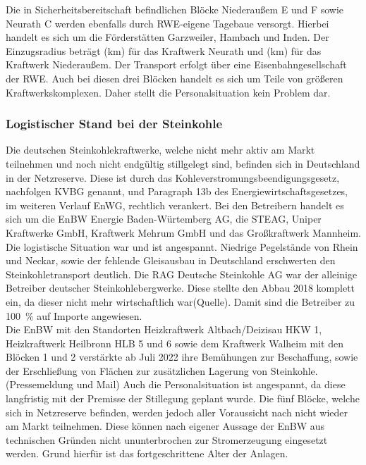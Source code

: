 		Die in Sicherheitsbereitschaft befindlichen Blöcke Niederaußem E und F sowie Neurath C werden ebenfalls durch RWE-eigene Tagebaue versorgt. Hierbei handelt es sich um die Förderstätten Garzweiler, Hambach und Inden. Der Einzugsradius beträgt (km) für das Kraftwerk Neurath und (km) für das Kraftwerk Niederaußem. Der Transport erfolgt über eine Eisenbahngesellschaft der RWE. Auch bei diesen drei Blöcken handelt es sich um Teile von größeren Kraftwerkskomplexen. Daher stellt die Personalsituation kein Problem dar.
		
		\subsubsection{Logistischer Stand bei der Steinkohle} \label{sect: Steinkohle}
		Die deutschen Steinkohlekraftwerke, welche nicht mehr aktiv am Markt teilnehmen und noch nicht endgültig stillgelegt sind, befinden sich in Deutschland in der Netzreserve. Diese ist durch das Kohleverstromungsbeendigungsgesetz, nachfolgen KVBG genannt, und Paragraph 13b des Energiewirtschaftsgesetzes, im weiteren Verlauf EnWG, rechtlich verankert. Bei den Betreibern handelt es sich um die EnBW Energie Baden-Würtemberg AG, die STEAG, Uniper Kraftwerke GmbH, Kraftwerk Mehrum GmbH und das Großkraftwerk Mannheim. \\
		
		Die logistische Situation war und ist angespannt. Niedrige Pegelstände von Rhein und Neckar, sowie der fehlende Gleisausbau in Deutschland erschwerten den Steinkohletransport deutlich. Die RAG Deutsche Steinkohle AG war der alleinige Betreiber deutscher Steinkohlebergwerke. Diese stellte den Abbau 2018 komplett ein, da dieser nicht mehr wirtschaftlich war(Quelle). Damit sind die Betreiber zu \SI{100}{\percent} auf Importe angewiesen.\\
		
		Die EnBW mit den Standorten Heizkraftwerk Altbach/Deizisau HKW 1, Heizkraftwerk Heilbronn HLB 5 und 6 sowie dem Kraftwerk Walheim mit den Blöcken 1 und 2 verstärkte ab Juli 2022 ihre Bemühungen zur Beschaffung, sowie der Erschließung von Flächen zur zusätzlichen Lagerung von Steinkohle.(Pressemeldung und Mail) Auch die Personalsituation ist angespannt, da diese langfristig mit der Premisse der Stillegung geplant wurde. Die fünf Blöcke, welche sich in Netzreserve befinden, werden jedoch aller Voraussicht nach nicht wieder am Markt teilnehmen. Diese können nach eigener Aussage der EnBW aus technischen Gründen nicht ununterbrochen zur Stromerzeugung eingesetzt werden. Grund hierfür ist das fortgeschrittene Alter der Anlagen.\\
		
